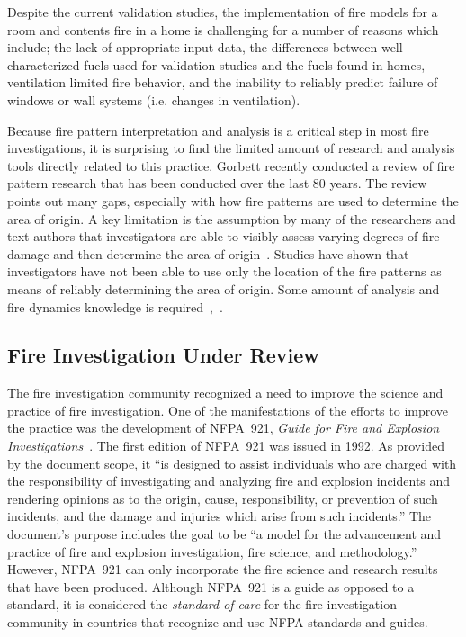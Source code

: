 \documentclass[twoside]{uocthesis}
\begin{document}
Despite the current validation studies, the implementation of fire models for a room and contents fire in a home is challenging for a number of reasons which include; the lack of appropriate input data, the differences between well characterized fuels used for validation studies and the fuels found in homes, ventilation limited fire behavior, and the inability to reliably predict failure of windows or wall systems (i.e. changes in ventilation). 

Because fire pattern interpretation and analysis is a critical step in most fire investigations, it is surprising to find the limited amount of research and analysis tools directly related to this practice.  Gorbett recently conducted a review of fire pattern research that has been conducted over the last 80 years. The review points out many gaps, especially with how fire patterns are used to determine the area of origin.  A key limitation is the assumption by many of the researchers and text authors that investigators are able to visibly assess varying degrees of fire damage and then determine the area of origin~\cite{Gorbett_2015}. Studies have shown that investigators have not been able to use only the location of the fire patterns as means of reliably determining the area of origin.  Some amount of analysis and fire dynamics knowledge is required~\cite{Carmen_2008},~\cite{Tinsley_2013}.      

\subsection{Fire Investigation Under Review}
The fire investigation community recognized a need to improve the science and practice of fire investigation.  One of the manifestations of the efforts to improve the practice was the development of NFPA~921, {\em Guide for Fire and Explosion Investigations}~\cite{NFPA:921}.  The first edition of NFPA~921 was issued in 1992.  As provided by the document scope, it ``is designed to assist individuals who are charged with the responsibility of investigating and analyzing fire and explosion incidents and rendering opinions as to the origin, cause, responsibility, or prevention of such incidents, and the damage and injuries which arise from such incidents.'' The document’s purpose includes the goal to be ``a model for the advancement and practice of fire and explosion investigation, fire science, and methodology.'' However, NFPA~921 can only incorporate the fire science and research results that have been produced.  Although NFPA~921 is a guide as opposed to a standard, it is considered the \textit{standard of care} for the fire investigation community in countries that recognize and use NFPA standards and guides.
\end{document}

